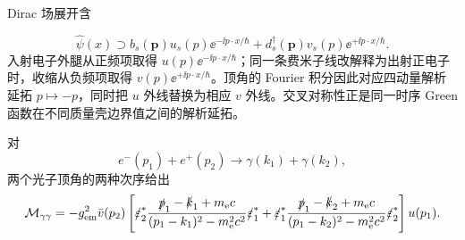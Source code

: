 \begin{derivation}
Dirac 场展开含

\begin{equation*}
 \hat\psi(x)\supset b_s(\mathbf p)u_s(p)\ee^{-\ii p\cdot x/\hbar}
 +d_s^\dagger(\mathbf p)v_s(p)\ee^{+\ii p\cdot x/\hbar}.
\end{equation*}
入射电子外腿从正频项取得 $u(p)\ee^{-\ii p\cdot x/\hbar}$；同一条费米子线改解释为出射正电子时，收缩从负频项取得 $v(p)\ee^{+\ii p\cdot x/\hbar}$。顶角的 Fourier 积分因此对应四动量解析延拓 $p\mapsto-p$，同时把 $u$ 外线替换为相应 $v$ 外线。交叉对称性正是同一时序 Green 函数在不同质量壳边界值之间的解析延拓。

对
\begin{equation*}
 e^-(p_1)+e^+(p_2)\to\gamma(k_1)+\gamma(k_2),
\end{equation*}
两个光子顶角的两种次序给出
\begin{equation*}
 {
 \mathcal M_{\gamma\gamma}
 =-g_{\rm em}^2\bar v(p_2)\left[
 \slashed\varepsilon_2^*
 \frac{\slashed p_1-\slashed k_1+m_{\mathrm e} c}{(p_1-k_1)^2-m_{\mathrm e}^2c^2}
 \slashed\varepsilon_1^*
 +\slashed\varepsilon_1^*
 \frac{\slashed p_1-\slashed k_2+m_{\mathrm e} c}{(p_1-k_2)^2-m_{\mathrm e}^2c^2}
 \slashed\varepsilon_2^*
 \right]u(p_1).}
 \end{equation*}
\end{derivation}

